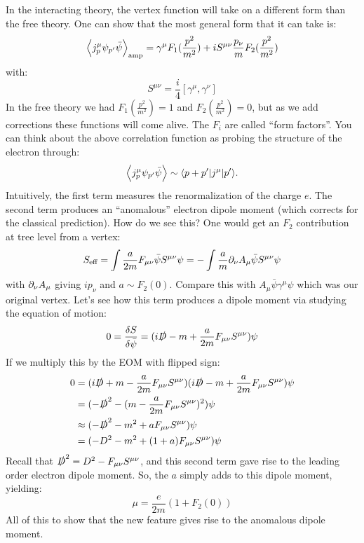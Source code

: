 In the interacting theory, the vertex function will take on a different form than the free theory. One can show that the most general form that it can take is:
\begin{equation}
    \left< j^\mu_p \psi_{p'}\bar{\psi} \right>_{\text{amp}} = \gamma^\mu F_1(\frac{p^2}{m^2}) + iS^{\mu\nu}\frac{p_\nu}{m}F_2(\frac{p^2}{m^2}) 
\end{equation}
with:
\begin{equation}
    S^{\mu\nu} = \frac{i}{4}[\gamma^\mu, \gamma^\nu]
\end{equation}
In the free theory we had $F_1(\frac{p^2}{m^2}) = 1$ and $F_2(\frac{p^2}{m^2})  = 0$, but as we add corrections these functions will come alive. The $F_i$ are called ``form factors''. You can think about the above correlation function as probing the structure of the electron through:
\begin{equation}
    \left< j^\mu_p\psi_{p'}\bar{\psi} \right> \sim \langle p + p' \rvert j^\mu \lvert p' \rangle.
\end{equation}
Intuitively, the first term measures the renormalization of the charge $e$. The second term produces an ``anomalous'' electron dipole moment (which corrects for the classical prediction). How do we see this? One would get an $F_2$ contribution at tree level from a vertex:
\begin{equation}
    S_{\text{eff}} = \int \frac{a}{2m}F_{\mu\nu}\bar{\psi}S^{\mu\nu}\psi = -\int \frac{a}{m}\partial_\nu A_\mu \bar{\psi}S^{\mu\nu}\psi
\end{equation}
with $\partial_\nu A_\mu$ giving $ip_\nu$ and $a \sim F_2(0)$. Compare this with $A_\mu \bar{\psi}\gamma^\mu\psi$ which was our original vertex. Let's see how this term produces a dipole moment via studying the equation of motion:
\begin{equation}
    0 = \frac{\delta S}{\delta \bar{\psi}} = (i\slashed{D} - m + \frac{a}{2m}F_{\mu\nu}S^{\mu\nu})\psi
\end{equation} 
If we multiply this by the EOM with flipped sign:
\begin{equation}
    \begin{split}
        0 &= (i\slashed{D} + m - \frac{a}{2m}F_{\mu\nu}S^{\mu\nu})(i\slashed{D} - m + \frac{a}{2m}F_{\mu\nu}S^{\mu\nu})\psi 
        \\ &= (-\slashed{D}^2 - (m - \frac{a}{2m}F_{\mu\nu}S^{\mu\nu})^2)\psi
        \\ &\approx (-\slashed{D}^2 - m^2 + aF_{\mu\nu}S^{\mu\nu})\psi
        \\ &= (-D^2 - m^2 + (1 + a)F_{\mu\nu}S^{\mu\nu})\psi
    \end{split}
\end{equation}
Recall that $\slashed{D}^2 = D^2 - F_{\mu\nu}S^{\mu\nu}$, and this second term gave rise to the leading order electron dipole moment. So, the $a$ simply adds to this dipole moment, yielding:
\begin{equation}
    \mu = \frac{e}{2m}(1 + F_2(0))
\end{equation}
All of this to show that the new feature gives rise to the anomalous dipole moment.

